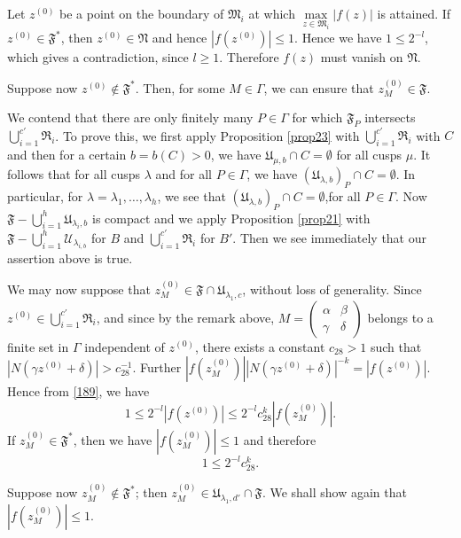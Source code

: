 Let $z^{(0)}$ be a point on the boundary of $\mathfrak{M}_{i}$ at
which $\max\limits_{z\in\mathfrak{M}_{i}}|f(z)|$ is attained. If
$z^{(0)}\in\mathfrak{F}^{\ast}$, then $z^{(0)}\in\mathfrak{N}$ and
hence $|f(z^{(0)})|\leq 1$. Hence we have $1\leq 2^{-l}$, which gives
a contradiction, since $l\geq 1$. Therefore $f(z)$ must vanish on
$\mathfrak{N}$.

Suppose now $z^{(0)}\not\in \mathfrak{F}^{\ast}$. Then, for some
$M\in\Gamma$, we can ensure that $z^{(0)}_{M}\in\mathfrak{F}$.

We contend that there are only finitely many $P\in\Gamma$ for which
$\mathfrak{F}_{P}$ intersects
$\bigcup\limits^{c'}_{i=1}\mathfrak{R}_{i}$. To prove this, we first
apply Proposition \ref{prop23} with
$\bigcup\limits^{c'}_{i=1}\mathfrak{R}_{i}$ with $C$ and then for a
certain $b=b(C)>0$, we have $\mathfrak{U}_{\mu,b}\cap C=\emptyset$ for
all cusps $\mu$. It follows that for all cusps $\lambda$ and for all
$P\in\Gamma$, we have $(\mathfrak{U}_{\lambda,b})_{P}\cap
C=\emptyset$. In particular, for
$\lambda=\lambda_{1},\ldots,\lambda_{h}$, we see that
$(\mathfrak{U}_{\lambda,b})_{P}\cap C=\emptyset$,\pageoriginale for
all $P\in\Gamma$. Now
$\mathfrak{F}-\bigcup\limits^{h}_{i=1}\mathfrak{U}_{\lambda_{i},b}$ is
compact and we apply Proposition \ref{prop21} with
$\mathfrak{F}-\bigcup\limits^{h}_{i=1}\mathcal{U}_{\lambda_{i,b}}$ for $B$ and
$\bigcup\limits^{c'}_{i=1}\mathfrak{R}_{i}$ for $B'$. Then we see
immediately that our assertion above is true.

We may now suppose that
$z^{(0)}_{M}\in\mathfrak{F}\cap\mathfrak{U}_{\lambda_{1},c}$, without
loss of generality. Since
$z^{(0)}\in\bigcup\limits^{c'}_{i=1}\mathfrak{R}_{i}$, and since by
the remark above, $M=\left(\begin{smallmatrix} \alpha &\beta\\ \gamma
  & \delta\end{smallmatrix}\right)$ belongs to a finite set in
  $\Gamma$ independent of $z^{(0)}$, there exists a constant
  $c_{28}>1$ such that $|N(\gamma
  z^{(0)}+\delta)|>c^{-1}_{28}$. Further $|f(z^{(0)}_{M})||N(\gamma
  z^{(0)}+\delta)|^{-k}=|f(z^{(0)})|$. Hence from \eqref{189}, we have
$$
1\leq 2^{-l}|f(z^{(0)})|\leq 2^{-l}c^{k}_{28}|f(z^{(0)}_{M})|.
$$
If $z^{(0)}_{M}\in\mathfrak{F}^{\ast}$, then we have
$|f(z^{(0)}_{M})|\leq 1$ and therefore
$$
1\leq 2^{-l}c^{k}_{28}.
$$

Suppose now $z^{(0)}_{M}\not\in \mathfrak{F}^{\ast}$; then
$z^{(0)}_{M}\in\mathfrak{U}_{\lambda_{1},d'}\cap \mathfrak{F}$. We
shall show again that $|f(z^{(0)}_{M})|\leq 1$.

